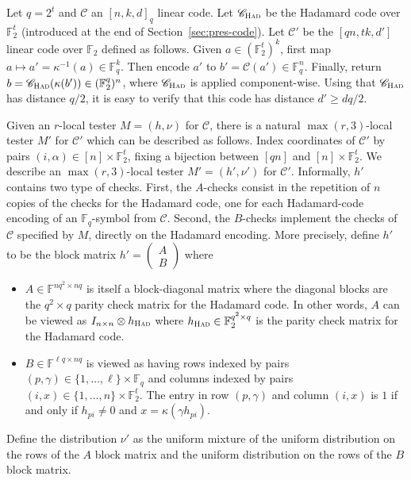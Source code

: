 \documentclass[11pt]{article}
\theoremstyle{definition}
\newcommand{\code}{\mathscr{C}}
\newcommand{\F}{\ensuremath{\mathbb{F}}}
\newcommand{\Had}{\ensuremath{\textsc{Had}}}
\newcommand{\had}{\textsc{Had}}
\begin{document}
Let $q=2^t$ and $\code$ an $[n,k,d]_q$ linear code. Let $\code_{\Had}$ be the Hadamard code over $\F_2^t$ (introduced at the end of Section~\ref{sec:pres-code}). 
Let $\code'$ be the $[qn,tk,d']$ linear code over $\F_2$ defined as follows. Given $a\in (\F_2^t)^{k}$, first map $a\mapsto a'=\kappa^{-1}(a) \in \F_q^{k}$. Then encode $a'$ to $b'=\code(a')\in \F_q^n$. Finally, return $b=\code_\Had(\kappa(b'))\in(\F_2^q)^n$, where $\code_\Had$ is applied component-wise. Using that $\code_\Had$ has distance $q/2$, it is easy to verify that this code has distance $d'\geq dq/2$.

Given an $r$-local tester $M=(h,\nu)$ for $\code$, there is a natural $\max(r,3)$-local tester $M'$ for $\code'$ which can be described as follows. Index coordinates of $\code'$ by pairs $(i,\alpha)\in [n]\times\F_2^t$, fixing a bijection between $[qn]$ and $[n]\times \F_2^t$.  We describe an $\max(r,3)$-local  tester $M' = (h',\nu')$ for $\code'$. Informally, $h'$ contains two type of checks. First, the $A$-checks consist in the repetition of $n$ copies of the checks for the Hadamard code, one for each Hadamard-code encoding of an $\F_q$-symbol from $\code$. Second, the $B$-checks implement the checks of $\code$ specified by $M$, directly on the Hadamard encoding. More precisely, define $h'$ to be the block matrix $h'=\begin{pmatrix} A \\ B \end{pmatrix}$ where 
\begin{itemize}
	\item $A \in \F^{nq^2 \times nq}$ is itself a block-diagonal matrix where the diagonal blocks are the $q^2 \times q$ parity check matrix for the Hadamard code. 
	In other words, $A$ can be viewed as $I_{n\times n} \otimes h_\had$ where $h_\had \in \F_2^{q^2 \times q}$ is the parity check matrix for the Hadamard code. 
	\item $B \in \F^{\ell q \times nq}$ is viewed as having rows indexed by pairs $(p,\gamma) \in \{1,\ldots,\ell\} \times \F_q$ and columns indexed by pairs $(i,x) \in \{1,\ldots,n\} \times \F_2^t$. The entry in row $(p,\gamma)$ and column $(i,x)$ is $1$ if and only if $h_{pi} \neq 0$ and $x = \kappa(\gamma h_{pi})$.
\end{itemize}
Define the distribution $\nu'$ as the uniform mixture of the uniform distribution on the rows of the $A$ block matrix and the uniform distribution on the rows of the $B$ block matrix. 
\end{document}
